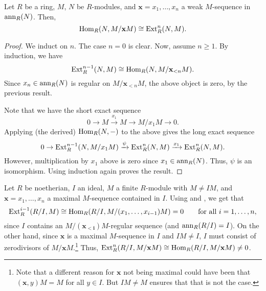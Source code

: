 \documentclass[12pt]{article}
\begin{document}
\begin{lem} \label{lem:Hom-Ext-regular-sequence}
	Let $R$ be a ring, $M$, $N$ be $R$-modules, and $\mathbf{x} = x_{1}, \ldots, x_{n}$ a weak $M$-sequence in $\operatorname{ann}_{R}(N)$. Then,
	\begin{equation*} 
		\operatorname{Hom}_{R}(N, M/\mathbf{x}M) \cong \operatorname{Ext}_{R}^{n}(N, M).
	\end{equation*}
\end{lem}
\begin{proof} 
	We induct on $n$. The case $n = 0$ is clear. Now, assume $n \ge 1$. By induction, we have
	\begin{equation*} 
		\operatorname{Ext}_{R}^{n - 1}(N, M) \cong \operatorname{Hom}_{R}(N, M/\mathbf{x}_{< n} M).
	\end{equation*}
	Since $x_{n} \in \operatorname{ann}_{R}(N)$ is regular on $M/\mathbf{x}_{< n} M$, the above object is zero, by the previous result.

	Note that we have the short exact sequence
	\begin{equation*} 
		0 \to M \xrightarrow{x_{1}} M \to M/x_{1} M \to 0.
	\end{equation*}
	Applying (the derived) $\operatorname{Hom}_{R}(N, -)$ to the above gives the long exact sequence
	\begin{equation*} 
		0 \to \operatorname{Ext}_{R}^{n - 1}(N, M/x_{1} M) \xrightarrow{\psi} \operatorname{Ext}_{R}^{n}(N, M) \xrightarrow{x_{1}} \operatorname{Ext}_{R}^{n}(N, M).
	\end{equation*}
	However, multiplication by $x_{1}$ above is zero since $x_{1} \in \operatorname{ann}_{R}(N)$. Thus, $\psi$ is an isomorphism. Using induction again proves the result.
\end{proof}

Let $R$ be noetherian, $I$ an ideal, $M$ a finite $R$-module with $M \neq IM$, and $\mathbf{x} = x_{1}, \ldots, x_{n}$ a maximal $M$-sequence contained in $I$. Using  and , we get that
\begin{equation*} 
	\operatorname{Ext}_{R}^{i - 1}(R/I, M) \cong \operatorname{Hom}_{R}(R/I, M/(x_{1}, \ldots, x_{i - 1})M) = 0 \qquad \text{for all $i = 1, \ldots, n$},
\end{equation*}
since $I$ contains an $M/(\mathbf{x_{< i}})M$-regular sequence (and $\operatorname{ann}_{R}(R/I) = I$). On the other hand, since $\mathbf{x}$ is a maximal $M$-sequence in $I$ and $IM \neq I$, $I$ must consist of zerodivisors of $M/\mathbf{x} M$.\footnote{Note that a different reason for $\mathbf{x}$ not being maximal could have been that $(\mathbf{x}, y)M = M$ for all $y \in I$. But $IM \neq M$ ensures that that is not the case.} Thus, $\operatorname{Ext}_{R}^{n}(R/I, M/\mathbf{x}M) \cong \operatorname{Hom}_{R}(R/I, M/\mathbf{x}M) \neq 0$.
\end{document}
